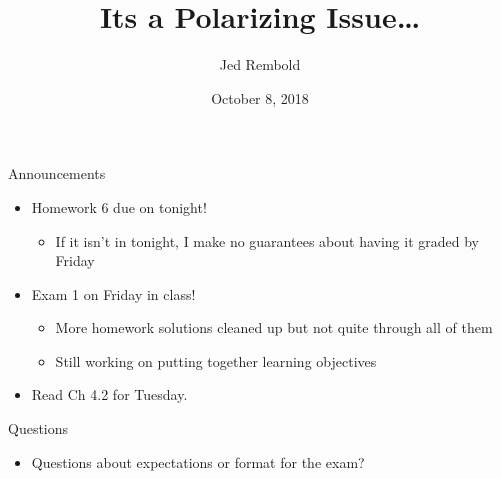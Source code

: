 \documentclass[pdf,aspectratio=169]{beamer}
\title{Its a Polarizing Issue\ldots}
\date{October 8, 2018}
\author{Jed Rembold}
\begin{document}
\renewcommand{\theenumi}{\Alph{enumi}}

\begin{frame}{Announcements}
	\begin{itemize}
		\item Homework 6 due on tonight!
			\begin{itemize}
				\item If it isn't in tonight, I make no guarantees about having it graded by Friday
			\end{itemize}
		\item Exam 1 on Friday in class!
			\begin{itemize}
				\item More homework solutions cleaned up but not quite through all of them
				\item Still working on putting together learning objectives
			\end{itemize}
		\item Read Ch 4.2 for Tuesday.
	\end{itemize}
\end{frame}

\begin{frame}{Questions}
	\begin{itemize}
		\item Questions about expectations or format for the exam?
	\end{itemize}
\end{frame}
\end{document}
